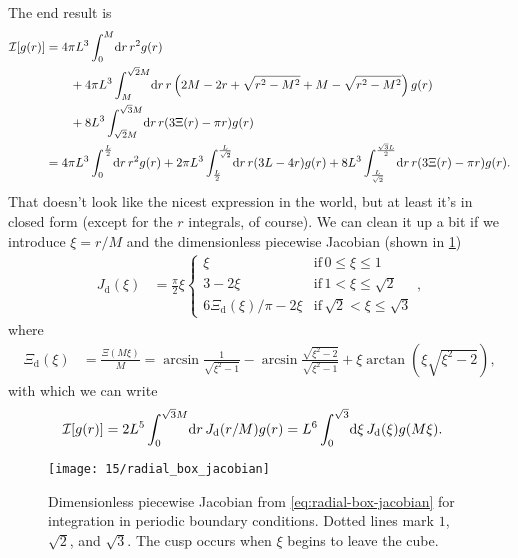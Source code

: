 The end result is
\begin{subequations}
\begin{align}
	\mathcal{I}[g(r)]
	&= 4 \pi L^3 \int_0^M\! \dif r \, r^2 g(r) \notag \\
	&\qquad
		+ 4 \pi L^3 \int_M^{\sqrt{2} M}\! \dif r \, r \left( 2 M - 2 r + \sqrt{r^2 - M^2} + M - \sqrt{r^2 - M^2} \right) g(r) \notag \\
	&\qquad
		+ 8 L^3 \int_{\sqrt{2} M}^{\sqrt{3} M}\! \dif r \, r (3 \Xi(r) - \pi r) g(r) \\
	&= 4 \pi L^3 \int_0^{\frac{L}{2}}\! \dif r \, r^2 g(r)
		+ 2 \pi L^3 \int_{\frac{L}{2}}^{\frac{L}{\sqrt{2}}}\! \dif r \, r (3 L - 4 r) g(r)
		+ 8 L^3 \int_{\frac{L}{\sqrt{2}}}^{\frac{\sqrt{3} L}{2}}\! \dif r \, r (3 \Xi(r) - \pi r) g(r).
\end{align}
\end{subequations}
That doesn't look like the nicest expression in the world, but at least it's in closed form (except for the $r$ integrals, of course).
We can clean it up a bit if we introduce $\xi = r / M$ and the dimensionless piecewise Jacobian (shown in \cref{fig:radial-box-jacobian})
\begin{align}
	J_\mathrm{d}(\xi)
	&= \frac{\pi}{2} \xi \begin{cases}
			\xi & \mathrm{if}\, 0 \le \xi \le 1 \\
			3 - 2 \xi & \mathrm{if}\, 1 < \xi \le \sqrt{2} \\
			6 \Xi_\mathrm{d}(\xi) / \pi - 2 \xi & \mathrm{if}\, \sqrt{2} < \xi \le \sqrt{3}
		\end{cases},
			\label{eq:radial-box-jacobian}
\end{align}
where
\begin{align}
	\Xi_\mathrm{d}(\xi)
	&= \frac{\Xi(M \xi)}{M}
	= \arcsin{\frac{1}{\sqrt{\xi^2 - 1}}}
		- \arcsin{\frac{\sqrt{\xi^2 - 2}}{\sqrt{\xi^2 - 1}}}
		+ \xi \arctan{(\xi \sqrt{\xi^2 - 2})},
\end{align}
with which we can write
\begin{align}
	\mathcal{I}[g(r)]
	&= 2 L^5 \int_0^{\sqrt{3} M}\! \dif r \, J_\mathrm{d}(r / M) g(r)
	= L^6 \int_0^{\sqrt{3}}\! \dif \xi \, J_\mathrm{d}(\xi) g(M \xi).
\end{align}

\begin{figure}
	\centering
	\texttt{[image: 15/radial\_box\_jacobian]}
	\caption[
		Dimensionless piecewise Jacobian for integration in periodic boundary conditions
	]{
		Dimensionless piecewise Jacobian from \cref{eq:radial-box-jacobian} for integration in periodic boundary conditions.
		Dotted lines mark $1$, $\sqrt{2}$, and $\sqrt{3}$.
		The cusp occurs when $\xi$ begins to leave the cube.
	}
	\label{fig:radial-box-jacobian}
\end{figure}
